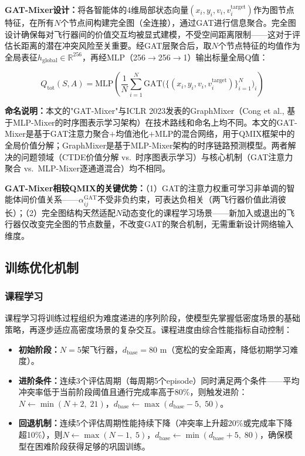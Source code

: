 \documentclass[12pt,a4paper,UTF8]{ctexart}
\begin{document}
\textbf{GAT-Mixer设计：}将各智能体的4维局部状态向量$(x_i, y_i, v_i, v_i^{\text{target}})$作为图节点特征，在所有$N$个节点间构建完全图（全连接），通过GAT进行信息聚合。完全图设计确保每对飞行器间的价值交互均被显式建模，不受空间距离限制——这对于评估长距离的潜在冲突风险至关重要。经GAT层聚合后，取$N$个节点特征的均值作为全局表征$h_{\text{global}} \in \mathbb{R}^{256}$，再经MLP（256$\to$256$\to$1）输出标量全局Q值：

\begin{equation}
    Q_{\text{tot}}(S, A) = \text{MLP}\left(\frac{1}{N}\sum_{i=1}^{N} \text{GAT}\big(\{(x_i, y_i, v_i, v_i^{\text{target}})\}_{i=1}^{N}\big)_i\right)
\end{equation}

\textbf{命名说明：}本文的"GAT-Mixer"与ICLR 2023发表的GraphMixer（Cong et al., 基于MLP-Mixer的时序图表示学习架构）\cite{ref25}在技术路线和命名上均不同。本文的GAT-Mixer是基于GAT注意力聚合$+$均值池化$+$MLP的混合网络，用于QMIX框架中的全局价值分解；GraphMixer是基于MLP-Mixer架构的时序链路预测模型。两者解决的问题领域（CTDE价值分解 vs.\ 时序图表示学习）与核心机制（GAT注意力聚合 vs.\ MLP-Mixer逐通道混合）均不相同。

\textbf{GAT-Mixer相较QMIX的关键优势：}（1）GAT的注意力权重可学习非单调的智能体间价值关系——$\alpha_{ij}^{\text{GAT}}$不受非负约束，可表达负相关（两飞行器价值此消彼长）；（2）完全图结构天然适配$N$动态变化的课程学习场景——新加入或退出的飞行器仅改变完全图的节点数量，不改变GAT的聚合机制，无需重新设计网络输入维度。

\subsection{训练优化机制}

\subsubsection{课程学习}

课程学习将训练过程组织为难度递进的序列阶段，使模型先掌握低密度场景的基础策略，再逐步适应高密度场景的复杂交互。课程进度由综合性能指标自动控制：

\begin{itemize}
    \item \textbf{初始阶段：}$N=5$架飞行器，$d_{\text{base}}=80$ m（宽松的安全距离，降低初期学习难度）。
    \item \textbf{进阶条件：}连续3个评估周期（每周期5个episode）同时满足两个条件——平均冲突率低于当前阶段阈值且通行完成率高于80\%，则触发进阶：$N \leftarrow \min(N+2,\; 21)$，$d_{\text{base}} \leftarrow \max(d_{\text{base}}-5,\; 50)$。
    \item \textbf{回退机制：}连续5个评估周期性能持续下降（冲突率上升超20\%或完成率下降超10\%），则$N \leftarrow \max(N-1,\; 5)$，$d_{\text{base}} \leftarrow \min(d_{\text{base}}+5,\; 80)$，确保模型在困难阶段获得足够的巩固训练。
\end{itemize}
\end{document}
